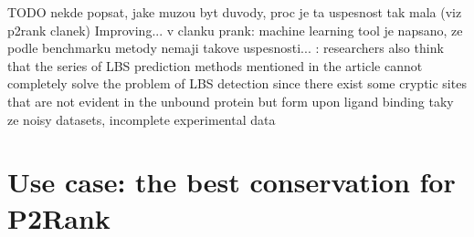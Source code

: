 TODO nekde popsat, jake muzou byt duvody, proc je ta uspesnost tak mala
(viz p2rank clanek) Improving...
v clanku prank: machine learning tool je napsano, ze podle benchmarku metody nemaji takove uspesnosti...
\cite{methods} : researchers also think that the series of LBS prediction methods mentioned in the article cannot completely solve the problem of LBS detection since there exist some cryptic sites that are not evident in the unbound protein but form upon ligand binding
taky ze noisy datasets, incomplete experimental data




\section{Use case: the best conservation for P2Rank}